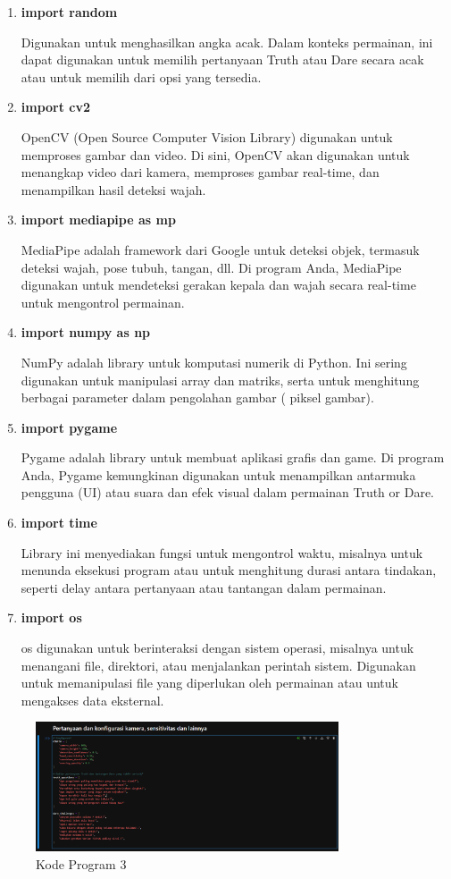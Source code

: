 \documentclass[11pt,a4paper]{article}
\begin{document}
\begin{enumerate}
    \item \textbf{import random}
    
Digunakan untuk menghasilkan angka acak. Dalam konteks permainan, ini dapat digunakan untuk memilih pertanyaan Truth atau Dare secara acak atau untuk memilih dari opsi yang tersedia.
    \item \textbf{import cv2}
    
OpenCV (Open Source Computer Vision Library) digunakan untuk memproses gambar dan video. Di sini, OpenCV akan digunakan untuk menangkap video dari kamera, memproses gambar real-time, dan menampilkan hasil deteksi wajah.
    \item \textbf{import mediapipe as mp}
    
MediaPipe adalah framework dari Google untuk deteksi objek, termasuk deteksi wajah, pose tubuh, tangan, dll. Di program Anda, MediaPipe digunakan untuk mendeteksi gerakan kepala dan wajah secara real-time untuk mengontrol permainan.
    \item \textbf{import numpy as np}
    
NumPy adalah library untuk komputasi numerik di Python. Ini sering digunakan untuk manipulasi array dan matriks, serta untuk menghitung berbagai parameter dalam pengolahan gambar ( piksel gambar).
    \item \textbf{import pygame}
    
Pygame adalah library untuk membuat aplikasi grafis dan game. Di program Anda, Pygame kemungkinan digunakan untuk menampilkan antarmuka pengguna (UI) atau suara dan efek visual dalam permainan Truth or Dare.
    \item \textbf{import time}
    
Library ini menyediakan fungsi untuk mengontrol waktu, misalnya untuk menunda eksekusi program atau untuk menghitung durasi antara tindakan, seperti delay antara pertanyaan atau tantangan dalam permainan.
    \item \textbf{import os}
    
os digunakan untuk berinteraksi dengan sistem operasi, misalnya untuk menangani file, direktori, atau menjalankan perintah sistem. Digunakan untuk memanipulasi file yang diperlukan oleh permainan atau untuk mengakses data eksternal.
\end{enumerate}

\begin{figure}[H]
    \centering
    \includegraphics[width=0.8\textwidth]{3.png} %
    \caption{Kode Program 3}
    \label{fig:3}
\end{figure}
\end{document}
